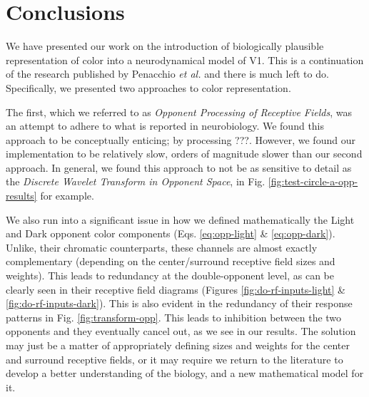 \documentclass[journal,onecolumn]{IEEEtran}
\begin{document}
\section{Conclusions}

We have presented our work on the introduction of biologically plausible representation of color into a neurodynamical model of V1. This is a continuation of the research published by Penacchio \textit{et al.} \cite{penacchio:2013} and there is much left to do. Specifically, we presented two approaches to color representation.

The first, which we referred to as \textit{Opponent Processing of Receptive Fields}, was an attempt to adhere to what is reported in neurobiology. We found this approach to be conceptually enticing; by processing ???. However, we found our implementation to be relatively slow, orders of magnitude slower than our second approach. In general, we found this approach to not be as sensitive to detail as the \textit{Discrete Wavelet Transform in Opponent Space}, in Fig. \ref{fig:test-circle-a-opp-results} for example.

We also run into a significant issue in how we defined mathematically the Light and Dark opponent color components (Eqs. \ref{eq:opp-light} \& \ref{eq:opp-dark}). Unlike, their chromatic counterparts, these channels are almost exactly complementary (depending on the center/surround receptive field sizes and weights). This leads to redundancy at the double-opponent level, as can be clearly seen in their receptive field diagrams (Figures \ref{fig:do-rf-inputs-light} \& \ref{fig:do-rf-inputs-dark}). This is also evident in the redundancy of their response patterns in Fig. \ref{fig:transform-opp}. This leads to inhibition between the two opponents and they eventually cancel out, as we see in our results. The solution may just be a matter of appropriately defining sizes and weights for the center and surround receptive fields, or it may require we return to the literature to develop a better understanding of the biology, and a new mathematical model for it.
\end{document}
